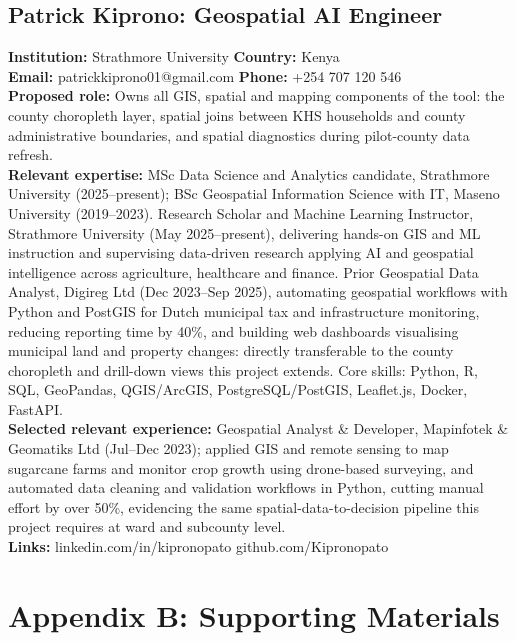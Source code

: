 \documentclass[12pt,a4paper]{article}
\begin{document}
\subsection*{Patrick Kiprono: Geospatial AI Engineer}
\textbf{Institution:} Strathmore University \quad \textbf{Country:} Kenya \\
\textbf{Email:} patrickkiprono01@gmail.com \quad \textbf{Phone:} +254 707 120 546 \\
\textbf{Proposed role:} Owns all GIS, spatial and mapping components of the tool: the county choropleth layer, spatial joins between KHS households and county administrative boundaries, and spatial diagnostics during pilot-county data refresh. \\
\textbf{Relevant expertise:} MSc Data Science and Analytics candidate, Strathmore University (2025--present); BSc Geospatial Information Science with IT, Maseno University (2019--2023). Research Scholar and Machine Learning Instructor, Strathmore University (May 2025--present), delivering hands-on GIS and ML instruction and supervising data-driven research applying AI and geospatial intelligence across agriculture, healthcare and finance. Prior Geospatial Data Analyst, Digireg Ltd (Dec 2023--Sep 2025), automating geospatial workflows with Python and PostGIS for Dutch municipal tax and infrastructure monitoring, reducing reporting time by 40\%, and building web dashboards visualising municipal land and property changes: directly transferable to the county choropleth and drill-down views this project extends. Core skills: Python, R, SQL, GeoPandas, QGIS/ArcGIS, PostgreSQL/PostGIS, Leaflet.js, Docker, FastAPI. \\
\textbf{Selected relevant experience:} Geospatial Analyst \& Developer, Mapinfotek \& Geomatiks Ltd (Jul--Dec 2023); applied GIS and remote sensing to map sugarcane farms and monitor crop growth using drone-based surveying, and automated data cleaning and validation workflows in Python, cutting manual effort by over 50\%, evidencing the same spatial-data-to-decision pipeline this project requires at ward and subcounty level. \\
\textbf{Links:} linkedin.com/in/kipronopato \quad github.com/Kipronopato

\newpage
\section*{Appendix B: Supporting Materials}
\end{document}

